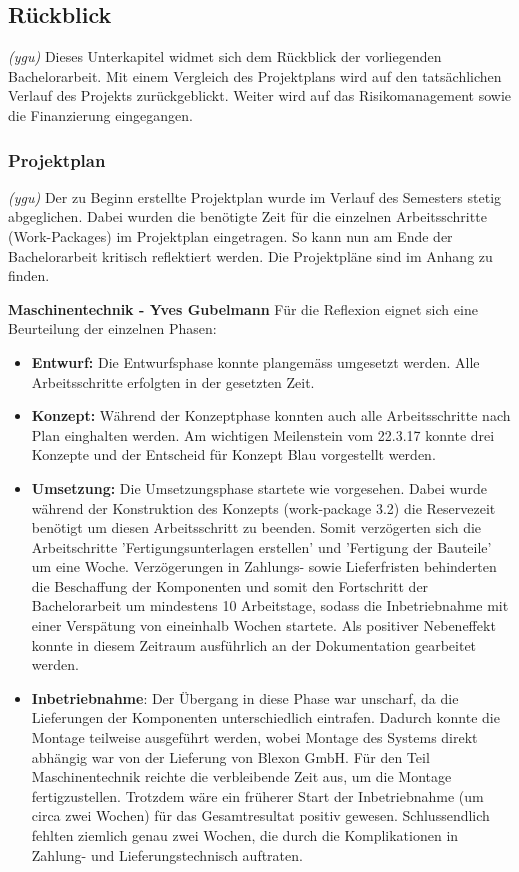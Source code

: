 \newpage
\subsection{Rückblick}
\textit{(ygu)} Dieses Unterkapitel widmet sich dem Rückblick der vorliegenden Bachelorarbeit. Mit einem Vergleich des Projektplans wird auf den tatsächlichen Verlauf des Projekts zurückgeblickt. Weiter wird auf das Risikomanagement sowie die Finanzierung eingegangen.
\subsubsection{Projektplan}
\label{projektplan}
\textit{(ygu)} Der zu Beginn erstellte Projektplan wurde im Verlauf des Semesters stetig abgeglichen. Dabei wurden die benötigte Zeit für die einzelnen Arbeitsschritte (Work-Packages) im Projektplan eingetragen. So kann nun am Ende der Bachelorarbeit kritisch reflektiert werden. Die Projektpläne sind im Anhang zu finden.
\newline

\textbf{Maschinentechnik - Yves Gubelmann}
\newline
Für die  Reflexion eignet sich eine Beurteilung der einzelnen Phasen:
\begin{itemize}
	\item \textbf{Entwurf:} Die Entwurfsphase konnte plangemäss umgesetzt werden. Alle Arbeitsschritte erfolgten in der gesetzten Zeit.
	
	\item \textbf{Konzept:} Während der Konzeptphase konnten auch alle Arbeitsschritte nach Plan einghalten werden. Am wichtigen Meilenstein vom 22.3.17 konnte drei Konzepte und der Entscheid für Konzept Blau vorgestellt werden.
	
	\item \textbf{Umsetzung:} Die Umsetzungsphase startete wie vorgesehen. Dabei wurde während der Konstruktion des Konzepts (work-package 3.2) die Reservezeit benötigt um diesen Arbeitsschritt zu beenden. Somit verzögerten sich die Arbeitschritte 'Fertigungsunterlagen erstellen' und 'Fertigung der Bauteile' um eine Woche. Verzögerungen in Zahlungs- sowie Lieferfristen behinderten die Beschaffung der Komponenten und somit den Fortschritt der Bachelorarbeit um mindestens 10 Arbeitstage, sodass die Inbetriebnahme mit einer Verspätung von eineinhalb Wochen startete. Als positiver Nebeneffekt konnte in diesem Zeitraum ausführlich an der Dokumentation gearbeitet werden.
	
	\item \textbf{Inbetriebnahme}: Der Übergang in diese Phase war unscharf, da die Lieferungen der Komponenten unterschiedlich eintrafen. Dadurch konnte die Montage teilweise ausgeführt werden, wobei Montage des Systems direkt abhängig war von der Lieferung von Blexon GmbH. Für den Teil Maschinentechnik reichte die verbleibende Zeit aus, um die Montage fertigzustellen. Trotzdem wäre ein früherer Start der Inbetriebnahme (um circa zwei Wochen) für das Gesamtresultat positiv gewesen. Schlussendlich fehlten ziemlich genau zwei Wochen, die durch die Komplikationen in Zahlung- und Lieferungstechnisch auftraten.

	
\end{itemize} 

